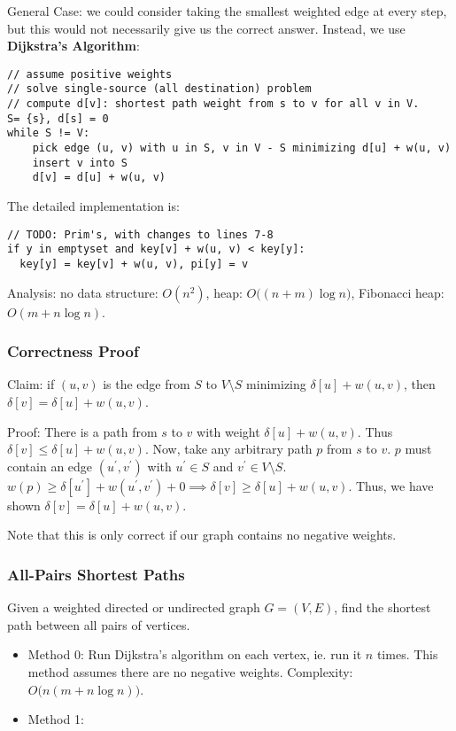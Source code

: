 \documentclass[12pt]{article}
\begin{document}
General Case: we could consider taking the smallest weighted edge at every step, but this would not necessarily give us the correct answer. Instead, we use {\bf Dijkstra's Algorithm}:
\begin{verbatim}
// assume positive weights
// solve single-source (all destination) problem
// compute d[v]: shortest path weight from s to v for all v in V.
S= {s}, d[s] = 0
while S != V:
    pick edge (u, v) with u in S, v in V - S minimizing d[u] + w(u, v)
    insert v into S
    d[v] = d[u] + w(u, v)
\end{verbatim}

The detailed implementation is:
\begin{verbatim}
// TODO: Prim's, with changes to lines 7-8
if y in emptyset and key[v] + w(u, v) < key[y]:
  key[y] = key[v] + w(u, v), pi[y] = v
\end{verbatim}

Analysis: no data structure: $O(n^2)$, heap: $O\bigl((n+m)\log n\bigl)$, Fibonacci heap: $O(m + n\log n)$.

\subsubsection{Correctness Proof}
Claim: if $(u, v)$ is the edge from $S$ to $V \setminus S$ minimizing $\delta[u] + w(u, v)$, then $\delta[v] = \delta[u] + w(u, v)$.

Proof: There is a path from $s$ to $v$ with weight $\delta[u] + w(u, v)$. Thus $\delta[v] \leq \delta[u] + w(u, v)$. Now, take any arbitrary path $p$ from $s$ to $v$. $p$ must contain an edge $(u^\prime, v^\prime)$ with $u^\prime \in S$ and $v^\prime \in V \setminus S$. $w(p) \geq \delta[u^\prime] + w(u^\prime, v^\prime) + 0 \implies \delta[v] \geq \delta[u] + w(u, v)$. Thus, we have shown $\delta[v] = \delta[u] + w(u, v)$.

Note that this is only correct if our graph contains no negative weights.

\subsubsection{All-Pairs Shortest Paths}
Given a weighted directed or undirected graph $G = (V, E)$, find the shortest path between all pairs of vertices.

\begin{itemize}
\item Method 0: Run Dijkstra's algorithm on each vertex, ie. run it $n$ times. This method assumes there are no negative weights. Complexity: $O\bigl(n(m + n\log n)\bigl)$.
\item Method 1:
\end{itemize}
\end{document}
